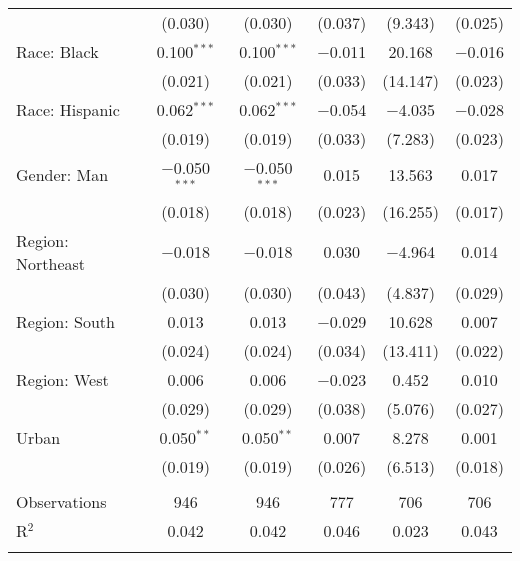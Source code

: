 \begin{tabular}{@{\extracolsep{5pt}}lccccc}
  & (0.030) & (0.030) & (0.037) & (9.343) & (0.025) \\ 
  Race: Black & 0.100$^{***}$ & 0.100$^{***}$ & $-$0.011 & 20.168 & $-$0.016 \\ 
  & (0.021) & (0.021) & (0.033) & (14.147) & (0.023) \\ 
  Race: Hispanic & 0.062$^{***}$ & 0.062$^{***}$ & $-$0.054 & $-$4.035 & $-$0.028 \\ 
  & (0.019) & (0.019) & (0.033) & (7.283) & (0.023) \\ 
  Gender: Man & $-$0.050$^{***}$ & $-$0.050$^{***}$ & 0.015 & 13.563 & 0.017 \\ 
  & (0.018) & (0.018) & (0.023) & (16.255) & (0.017) \\ 
  Region: Northeast & $-$0.018 & $-$0.018 & 0.030 & $-$4.964 & 0.014 \\ 
  & (0.030) & (0.030) & (0.043) & (4.837) & (0.029) \\ 
  Region: South & 0.013 & 0.013 & $-$0.029 & 10.628 & 0.007 \\ 
  & (0.024) & (0.024) & (0.034) & (13.411) & (0.022) \\ 
  Region: West & 0.006 & 0.006 & $-$0.023 & 0.452 & 0.010 \\ 
  & (0.029) & (0.029) & (0.038) & (5.076) & (0.027) \\ 
  Urban & 0.050$^{**}$ & 0.050$^{**}$ & 0.007 & 8.278 & 0.001 \\ 
  & (0.019) & (0.019) & (0.026) & (6.513) & (0.018) \\ 
 \hline \\[-1.8ex] 

Observations & 946 & 946 & 777 & 706 & 706 \\ 
R$^{2}$ & 0.042 & 0.042 & 0.046 & 0.023 & 0.043 \\ 
\hline 
\hline \\[-1.8ex] 
\end{tabular} 